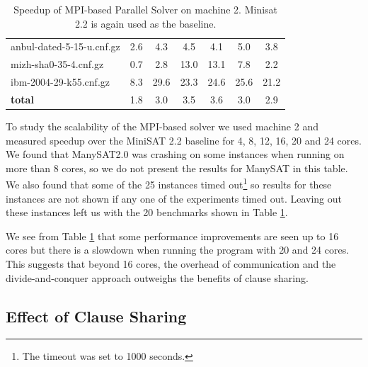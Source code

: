 \documentclass[letterpaper, compsoc, conference]{IEEEtran}
\begin{document}
\begin{table}[htbp]
\begin{center}
\begin{tabular}{|l|c|c|c|c|c|c|}
      anbul-dated-5-15-u.cnf.gz &                2.6 &  4.3 &  4.5 &  4.1 &  5.0 &  3.8 \\
      mizh-sha0-35-4.cnf.gz &                    0.7 &  2.8 & 13.0 & 13.1 &  7.8 &  2.2 \\
      ibm-2004-29-k55.cnf.gz &                   8.3 & 29.6 & 23.3 & 24.6 & 25.6 & 21.2 \\
      \hline
      \textbf{total}  &                          1.8 &  3.0 &  3.5 &  3.6 &  3.0 &  2.9 \\
      \hline
    \end{tabular}
    \end{center}
    \caption{Speedup of MPI-based Parallel Solver on machine 2. Minisat 2.2 is again
    used as the baseline.}
    \label{tab:scalability}
\end{table}

To study the scalability of the MPI-based solver we used machine 2 and measured
speedup over the MiniSAT 2.2 baseline for 4, 8, 12, 16, 20 and 24 cores. We
found that ManySAT2.0 was crashing on some instances when running on more than
8 cores, so we do not present the results for ManySAT in this table. We also
found that some of the 25 instances timed out\footnote{The timeout was set to
1000 seconds.} so results for these instances are not shown if any one of the
experiments timed out. Leaving out these instances left us with the 20
benchmarks shown in Table \ref{tab:scalability}. 

We see from Table \ref{tab:scalability} that some performance improvements are
seen up to 16 cores but there is a slowdown when running the program with 20
and 24 cores. This suggests that beyond 16 cores, the overhead of communication
and the divide-and-conquer approach outweighs the benefits of clause sharing.

\subsection{Effect of Clause Sharing}
\label{sec:sharing effects}
\end{document}
